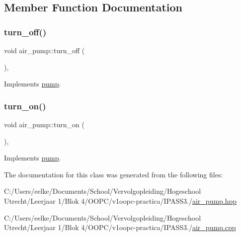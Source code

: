 \subsection{Member Function Documentation}
\mbox{\label{classair__pump_a9162180a77749f04ae735debb3f36bf9}} 
\subsubsection{\texorpdfstring{turn\+\_\+off()}{turn\_off()}}
{\footnotesize\ttfamily void air\+\_\+pump\+::turn\+\_\+off (\begin{DoxyParamCaption}{ }\end{DoxyParamCaption})\hspace{0.3cm}{\ttfamily [override]}, {\ttfamily [virtual]}}



Implements \hyperlink{classpump_a62d85abfd2f7c79b78bca51af80a909d}{pump}.

\mbox{\label{classair__pump_a4d97870633167dda02141e0630e468a3}} 
\subsubsection{\texorpdfstring{turn\+\_\+on()}{turn\_on()}}
{\footnotesize\ttfamily void air\+\_\+pump\+::turn\+\_\+on (\begin{DoxyParamCaption}{ }\end{DoxyParamCaption})\hspace{0.3cm}{\ttfamily [override]}, {\ttfamily [virtual]}}



Implements \hyperlink{classpump_a2c0ed32be49cad297b49ec2c97403a2c}{pump}.



The documentation for this class was generated from the following files\+:\begin{DoxyCompactItemize}
\item 
C\+:/\+Users/eelke/\+Documents/\+School/\+Vervolgopleiding/\+Hogeschool Utrecht/\+Leerjaar 1/\+Blok 4/\+O\+O\+P\+C/v1oopc-\/practica/\+I\+P\+A\+S\+S3./\hyperlink{air__pump_8hpp}{air\+\_\+pump.\+hpp}\item 
C\+:/\+Users/eelke/\+Documents/\+School/\+Vervolgopleiding/\+Hogeschool Utrecht/\+Leerjaar 1/\+Blok 4/\+O\+O\+P\+C/v1oopc-\/practica/\+I\+P\+A\+S\+S3./\hyperlink{air__pump_8cpp}{air\+\_\+pump.\+cpp}\end{DoxyCompactItemize}
